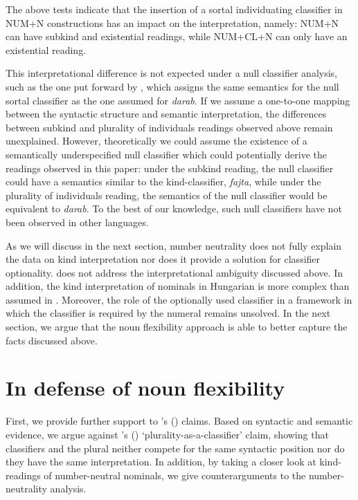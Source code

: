 \documentclass[output=paper]{langscibook}
\begin{document}
\noindent The above tests indicate that the insertion of a sortal individuating classifier in NUM+N constructions has an impact on the interpretation, namely: NUM+N can have subkind and existential readings, while NUM+CL+N can only have an existential reading.

This interpretational difference is not expected under a null classifier analysis, such as the one put forward by \citet{csirmaz-dekany-14}, which assigns the same semantics for the null sortal classifier as the one assumed for \textit{darab}. If we assume a one-to-one mapping between the syntactic structure and semantic interpretation, the differences between subkind and plurality of individuals readings observed above remain unexplained. However, theoretically we could assume the existence of a semantically underspecified null classifier which could potentially derive the readings observed in this paper: under the subkind reading, the null classifier could have a semantics similar to the kind-classifier, \textit{fajta}, while under the plurality of individuals reading, the semantics of the null classifier would be equivalent to \textit{darab}. To the best of our knowledge, such null classifiers have not been observed in other languages. 

As we will discuss in the next section, number neutrality does not fully explain the data on kind interpretation nor does it provide a solution for classifier optionality. \citet{erbach-etal-19} does not address the interpretational ambiguity discussed above.  In addition, the kind interpretation of nominals in Hungarian is more complex than assumed in \citet{erbach-etal-19}. Moreover, the role of the optionally used classifier in a framework in which the classifier is required by the numeral remains unsolved. 
In the next section, we argue that the noun flexibility approach is able to better capture the facts discussed above. 

\section{In defense of noun flexibility} \label{schv-nem:sec:3}
 
First, we provide further support to  \citeauthor{schvarcz-rothstein-17}’s (\citeyear{schvarcz-rothstein-17}) claims. Based on syntactic and semantic evidence, we argue against \citeauthor{csirmaz-dekany-14}'s (\citeyear{csirmaz-dekany-14}) `plurality-as-a-classifier' claim, showing that classifiers and the plural neither compete for the same syntactic position nor do they have the same interpretation. In addition, by taking a closer look at kind-readings of number-neutral nominals, we give counterarguments to the number-neutrality analysis. 
\end{document}
